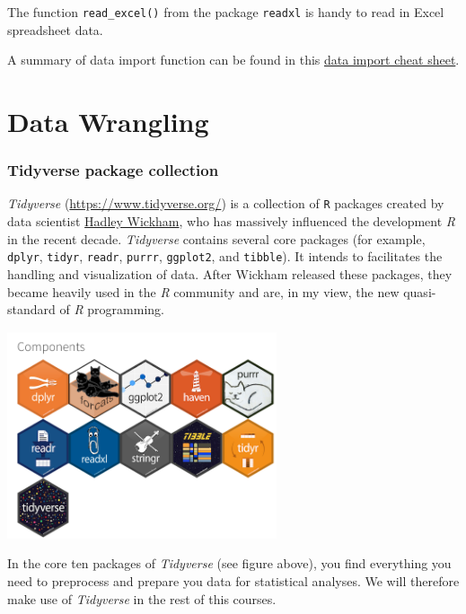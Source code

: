 \documentclass[
]{scrartcl}
\begin{document}
The function \texttt{read\_excel()} from the package \texttt{readxl} is handy to read in Excel spreadsheet data.

A summary of data import function can be found in this \protect\hyperlink{cheatsheets}{data import cheat sheet}.

\newpage

\hypertarget{part-data-wrangling}{%
\part{Data Wrangling}\label{part-data-wrangling}}

\hypertarget{tidyverse-package-collection}{%
\section{Tidyverse package collection}\label{tidyverse-package-collection}}

\emph{Tidyverse} (\url{https://www.tidyverse.org/}) is a collection of \texttt{R} packages created by data scientist \href{http://hadley.nz/}{Hadley Wickham}, who has massively influenced the development \emph{R} in the recent decade. \emph{Tidyverse} contains several core packages (for example, \texttt{dplyr}, \texttt{tidyr}, \texttt{readr}, \texttt{purrr}, \texttt{ggplot2}, and \texttt{tibble}). It intends to facilitates the handling and visualization of data. After Wickham released these packages, they became heavily used in the \emph{R} community and are, in my view, the new quasi-standard of \emph{R} programming.

\begin{center}\includegraphics[width=300px]{images/tidyverse_components} \end{center}

In the core ten packages of \emph{Tidyverse} (see figure above), you find everything you need to preprocess and prepare you data for statistical analyses. We will therefore make use of \emph{Tidyverse} in the rest of this courses.
\end{document}
